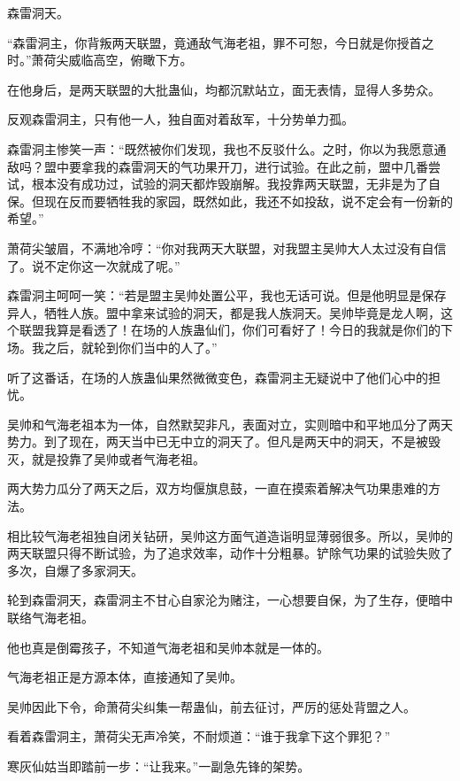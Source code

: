 
\begin{this_body}

森雷洞天。

“森雷洞主，你背叛两天联盟，竟通敌气海老祖，罪不可恕，今日就是你授首之时。”萧荷尖威临高空，俯瞰下方。

在他身后，是两天联盟的大批蛊仙，均都沉默站立，面无表情，显得人多势众。

反观森雷洞主，只有他一人，独自面对着敌军，十分势单力孤。

森雷洞主惨笑一声：“既然被你们发现，我也不反驳什么。之时，你以为我愿意通敌吗？盟中要拿我的森雷洞天的气功果开刀，进行试验。在此之前，盟中几番尝试，根本没有成功过，试验的洞天都炸毁崩解。我投靠两天联盟，无非是为了自保。但现在反而要牺牲我的家园，既然如此，我还不如投敌，说不定会有一份新的希望。”

萧荷尖皱眉，不满地冷哼：“你对我两天大联盟，对我盟主吴帅大人太过没有自信了。说不定你这一次就成了呢。”

森雷洞主呵呵一笑：“若是盟主吴帅处置公平，我也无话可说。但是他明显是保存异人，牺牲人族。盟中拿来试验的洞天，都是我人族洞天。吴帅毕竟是龙人啊，这个联盟我算是看透了！在场的人族蛊仙们，你们可看好了！今日的我就是你们的下场。我之后，就轮到你们当中的人了。”

听了这番话，在场的人族蛊仙果然微微变色，森雷洞主无疑说中了他们心中的担忧。

吴帅和气海老祖本为一体，自然默契非凡，表面对立，实则暗中和平地瓜分了两天势力。到了现在，两天当中已无中立的洞天了。但凡是两天中的洞天，不是被毁灭，就是投靠了吴帅或者气海老祖。

两大势力瓜分了两天之后，双方均偃旗息鼓，一直在摸索着解决气功果患难的方法。

相比较气海老祖独自闭关钻研，吴帅这方面气道造诣明显薄弱很多。所以，吴帅的两天联盟只得不断试验，为了追求效率，动作十分粗暴。铲除气功果的试验失败了多次，自爆了多家洞天。

轮到森雷洞天，森雷洞主不甘心自家沦为赌注，一心想要自保，为了生存，便暗中联络气海老祖。

他也真是倒霉孩子，不知道气海老祖和吴帅本就是一体的。

气海老祖正是方源本体，直接通知了吴帅。

吴帅因此下令，命萧荷尖纠集一帮蛊仙，前去征讨，严厉的惩处背盟之人。

看着森雷洞主，萧荷尖无声冷笑，不耐烦道：“谁于我拿下这个罪犯？”

寒灰仙姑当即踏前一步：“让我来。”一副急先锋的架势。


\end{this_body}
